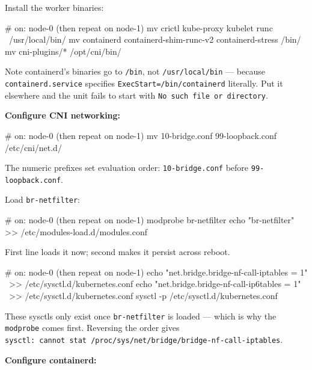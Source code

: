 \documentclass[11pt,oneside]{report}
\begin{document}
Install the worker
binaries:

\begin{cmdlst}
# on: node-0 (then repeat on node-1)
{
  mv crictl kube-proxy kubelet runc \
    /usr/local/bin/
  mv containerd containerd-shim-runc-v2 containerd-stress /bin/
  mv cni-plugins/* /opt/cni/bin/
}
\end{cmdlst}

Note containerd's
binaries go to
\texttt{/bin}, not
\texttt{/usr/local/bin}
--- because
\texttt{containerd.}\allowbreak{}\texttt{service}
specifies
\texttt{ExecStart=/}\allowbreak{}\texttt{bin/}\allowbreak{}\texttt{containerd}
literally. Put it
elsewhere and the
unit fails to start
with
\texttt{No\ such\ file\ or\ directory}.

\textbf{Configure
CNI networking:}

\begin{cmdlst}
# on: node-0 (then repeat on node-1)
mv 10-bridge.conf 99-loopback.conf /etc/cni/net.d/
\end{cmdlst}

The numeric prefixes
set evaluation
order:
\texttt{10-bridge.conf}
before
\texttt{99-}\allowbreak{}\texttt{loopback.}\allowbreak{}\texttt{conf}.

Load
\texttt{br-netfilter}:

\begin{cmdlst}
# on: node-0 (then repeat on node-1)
{
  modprobe br-netfilter
  echo "br-netfilter" >> /etc/modules-load.d/modules.conf
}
\end{cmdlst}

First line loads it
now; second makes it
persist across
reboot.

\begin{cmdlst}
# on: node-0 (then repeat on node-1)
{
  echo "net.bridge.bridge-nf-call-iptables = 1" \
    >> /etc/sysctl.d/kubernetes.conf
  echo "net.bridge.bridge-nf-call-ip6tables = 1" \
    >> /etc/sysctl.d/kubernetes.conf
  sysctl -p /etc/sysctl.d/kubernetes.conf
}
\end{cmdlst}

These sysctls only
exist once
\texttt{br-netfilter}
is loaded --- which
is why the
\texttt{modprobe}
comes first.
Reversing the order
gives
\texttt{sysctl:}\allowbreak{}\texttt{\ cannot\ stat\ /}\allowbreak{}\texttt{proc/}\allowbreak{}\texttt{sys/}\allowbreak{}\texttt{net/}\allowbreak{}\texttt{bridge/}\allowbreak{}\texttt{bridge-}\allowbreak{}\texttt{nf-}\allowbreak{}\texttt{call-}\allowbreak{}\texttt{iptables}.

\textbf{Configure
containerd:}
\end{document}
